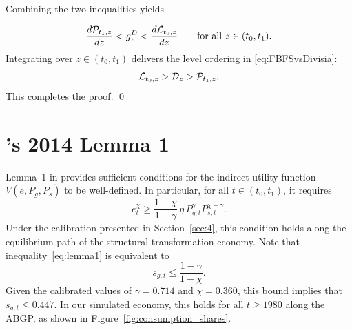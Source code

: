 \documentclass[12pt,a4paper]{article}
\begin{document}
\begin{appendices}
Combining the two inequalities yields

\[
\frac{d{\cal P}_{t_1,z}}{dz}<g_z^D<\frac{d{\cal L}_{t_0,z}}{dz}
\qquad \text{for all } z\in(t_0,t_1).
\]
Integrating over \(z\in(t_0,t_1)\) delivers the level ordering in \eqref{eq:FBFSvsDivisia}:
\[
{\cal L}_{t_0,z} > {\cal D}_{z}  > {\cal P}_{t_1,z}.
\]
This completes the proof. \qed

















\section{\citeauthor{Boppart_2014}'s 2014 Lemma 1}
Lemma~1 in \cite{Boppart_2014} provides sufficient conditions for the indirect utility function \( V(e, P_g, P_s) \) to be well-defined. In particular, for all \( t \in (t_0, t_1) \), it requires
\begin{equation}\label{eq:lemma1}
e_t^\chi \geq \frac{1 - \chi}{1 - \gamma} \, \eta \, P_{g,t}^\gamma P_{s,t}^{\chi - \gamma} .
\end{equation}
Under the calibration presented in Section~\ref{sec:4}, this condition holds along the equilibrium path of the structural transformation economy.
Note that inequality~\eqref{eq:lemma1} is equivalent to
\[
s_{g,t} \leq \frac{1 - \gamma}{1 - \chi} .
\]
Given the calibrated values of \( \gamma = 0.714 \) and \( \chi = 0.360 \), this bound implies that \( s_{g,t} \leq 0.447 \). In our simulated economy, this holds for all \( t \geq 1980 \) along the ABGP, as shown in Figure~\ref{fig:consumption_shares}.


\end{appendices}
\end{document}
